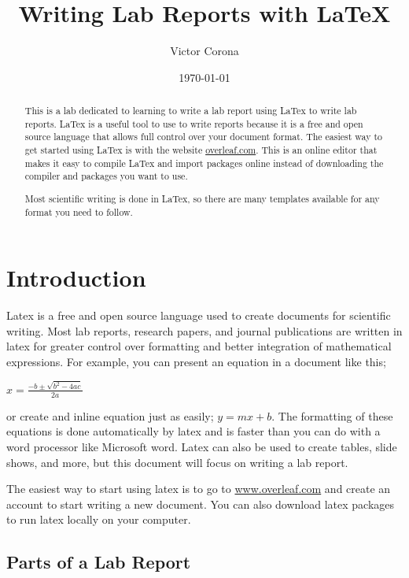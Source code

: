 \documentclass{article}
\title{Writing Lab Reports with \LaTeX}
\author{Victor Corona}
\date{\today}
\begin{document}
\maketitle

\begin{abstract}

This is a lab dedicated to learning to write a lab report using LaTex to write lab reports. LaTex is a useful tool to use to write reports because it is a free and open source language that allows full control over your document format. The easiest way to get started using LaTex is with the website \href{www.overleaf.com}{overleaf.com}. This is an online editor that makes it easy to compile LaTex and import packages online instead of downloading the compiler and packages you want to use. 

Most scientific writing is done in LaTex, so there are many templates available for any format you need to follow. 
    
\end{abstract}

\section{Introduction}

Latex is a free and open source language used to create documents for scientific writing. Most lab reports, research papers, and journal publications are written in latex for greater control over formatting and better integration of mathematical expressions. For example, you can present an equation in a document like this;
\begin{center}
    $x=\frac{-b \pm \sqrt{b^2 - 4ac}}{2a}$
\end{center}
or create and inline equation just as easily; $y=mx+b$. The formatting of these equations is done automatically by latex and is faster than you can do with a word processor like Microsoft word. Latex can also be used to create tables, slide shows, and more, but this document will focus on writing a lab report. 

The easiest way to start using latex is to go to \url{www.overleaf.com} and create an account to start writing a new document. You can also download latex packages to run latex locally on your computer.

\subsection{Parts of a Lab Report}
\end{document}

